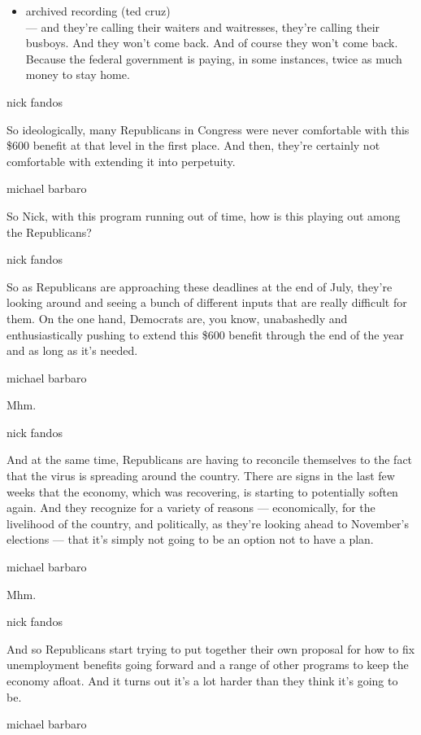 \begin{itemize}
\tightlist
\item
  archived recording (ted cruz)\\
  --- and they're calling their waiters and waitresses, they're calling
  their busboys. And they won't come back. And of course they won't come
  back. Because the federal government is paying, in some instances,
  twice as much money to stay home.
\end{itemize}

nick fandos

So ideologically, many Republicans in Congress were never comfortable
with this \$600 benefit at that level in the first place. And then,
they're certainly not comfortable with extending it into perpetuity.

michael barbaro

So Nick, with this program running out of time, how is this playing out
among the Republicans?

nick fandos

So as Republicans are approaching these deadlines at the end of July,
they're looking around and seeing a bunch of different inputs that are
really difficult for them. On the one hand, Democrats are, you know,
unabashedly and enthusiastically pushing to extend this \$600 benefit
through the end of the year and as long as it's needed.

michael barbaro

Mhm.

nick fandos

And at the same time, Republicans are having to reconcile themselves to
the fact that the virus is spreading around the country. There are signs
in the last few weeks that the economy, which was recovering, is
starting to potentially soften again. And they recognize for a variety
of reasons --- economically, for the livelihood of the country, and
politically, as they're looking ahead to November's elections --- that
it's simply not going to be an option not to have a plan.

michael barbaro

Mhm.

nick fandos

And so Republicans start trying to put together their own proposal for
how to fix unemployment benefits going forward and a range of other
programs to keep the economy afloat. And it turns out it's a lot harder
than they think it's going to be.

michael barbaro

